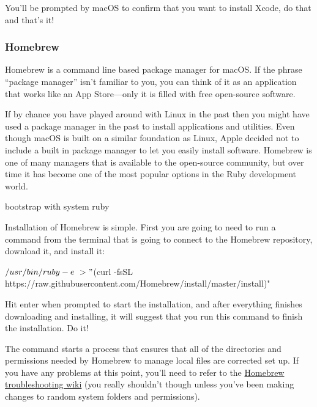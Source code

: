 You'll be prompted by macOS to confirm that you want to install Xcode, do that and that's it!


\subsubsection{Homebrew}
\label{sec:homebrew}

Homebrew is a command line based package manager for macOS\@. If the phrase ``package manager'' isn't familiar to you, you can think of it as an application that works like an App Store---only it is filled with free open-source software.

If by chance you have played around with Linux in the past then you might have used a package manager in the past to install applications and utilities. Even though macOS is built on a similar foundation as Linux, Apple decided not to include a built in package manager to let you easily install software. Homebrew is one of many managers that is available to the open-source community, but over time it has become one of the most popular options in the Ruby development world.

bootstrap with system ruby

Installation of Homebrew is simple. First you are going to need to run a command from the terminal that is going to connect to the Homebrew repository, download it, and install it:

\begin{codelisting}
\label{code:homebrew-install}
\begin{code}
$ /usr/bin/ruby -e \
> "$(curl -fsSL https://raw.githubusercontent.com/Homebrew/install/master/install)"
\end{code}
\end{codelisting}

Hit enter when prompted to start the installation, and after everything finishes downloading and installing, it will suggest that you run this command to finish the installation. Do it!

The  command starts a process that ensures that all of the directories and permissions needed by Homebrew to manage local files are corrected set up. If you have any problems at this point, you'll need to refer to the \href{https://github.com/Homebrew/homebrew/wiki/troubleshooting}{Homebrew troubleshooting wiki} (you really shouldn't though unless you've been making changes to random system folders and permissions).

